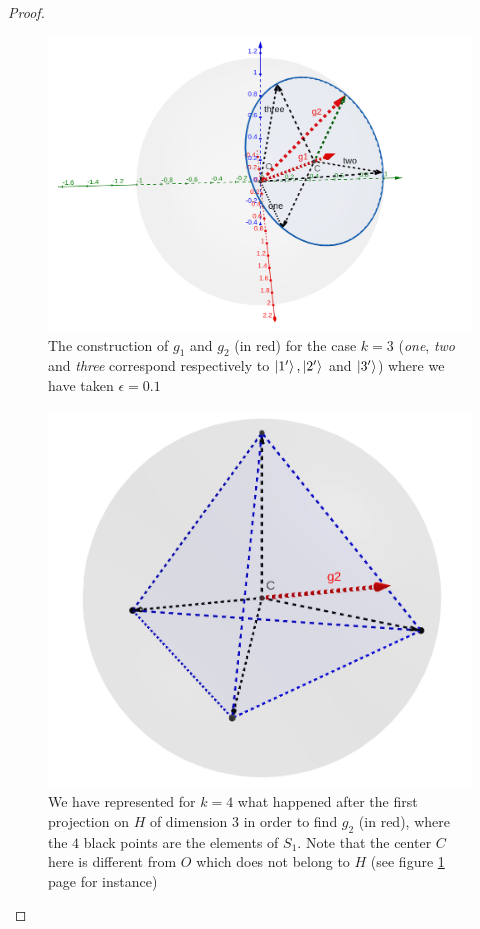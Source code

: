 \documentclass{article}
\theoremstyle{definition}
\theoremstyle{remark}
\begin{document}
\begin{proof}
      \begin{figure}[!h]
        \begin{center}
          \includegraphics[scale=0.25]{CEgreedypure.png}
          \caption{The construction of $g_1$ and $g_2$ (in red) for the case $k=3$ (\emph{one}, \emph{two} and \emph{three} correspond respectively to $\ket{1'},\ket{2'}$ and $\ket{3'}$) where we have taken $\epsilon=0.1$}
          \label{CEgreedypuredim3}
        \end{center}
      \end{figure}
      \begin{figure}[!h]
        \begin{center}
          \includegraphics[scale=0.25]{CEgreedyProjDim4.png}
          \caption{We have represented for $k=4$ what happened after the first projection on $H$ of dimension 3 in order to find $g_2$ (in red), where the $4$ black points are the elements of $S_1$. Note that the center $C$ here is different from $O$ which does not belong to $H$ (see figure \ref{CEgreedypuredim3} page \pageref{CEgreedypuredim3} for instance)}
          \label{CEgreedypuredim4}
        \end{center}
      \end{figure}


\end{proof}
\end{document}
